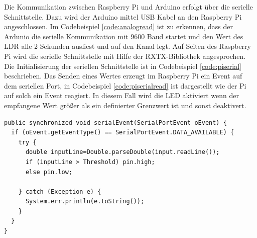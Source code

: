 Die Kommunikation zwischen Raspberry Pi und Arduino erfolgt über die serielle Schnittstelle. Dazu wird der Arduino mittel USB Kabel an den Raspberry Pi angeschlossen. Im Codebeispiel \ref{code:analogread} ist zu erkennen, dass der Ardunio die serielle Kommunikation mit 9600 Baud startet und den Wert des LDR alle 2 Sekunden ausliest und auf den Kanal legt. Auf Seiten des Raspberry Pi wird die serielle Schnittstelle mit Hilfe der RXTX-Bibliothek angesprochen. Die Initialisierung der seriellen Schnittstelle ist in Codebeispiel \ref{code:piserial} beschrieben. Das Senden eines Wertes erzeugt im Raspberry Pi ein Event auf dem seriellen Port, in Codebeispiel \ref{code:piserialread} ist dargestellt wie der Pi auf solch ein Event reagiert. In diesem Fall wird die LED aktiviert wenn der empfangene Wert größer als ein definierter Grenzwert ist und sonst deaktivert.

\begin{lstlisting}[float=htb,caption={Auslesen der seriellen Schnittstelle im Raspberry Pi, \quelle\url{http://playground.arduino.cc/Interfacing/Java}},label=code:piserialread]
public synchronized void serialEvent(SerialPortEvent oEvent) {
  if (oEvent.getEventType() == SerialPortEvent.DATA_AVAILABLE) {
    try {
      double inputLine=Double.parseDouble(input.readLine());
	  if (inputLine > Threshold) pin.high;
	  else pin.low;
	  
	} catch (Exception e) {
	  System.err.println(e.toString());
	}
  }
}
\end{lstlisting}




